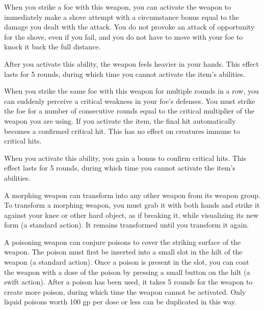 
 When you strike a foe with this weapon, you can activate the weapon to immediately make a shove attempt with a circumstance bonus equal to the damage you dealt with the attack. You do not provoke an attack of opportunity for the shove, even if you fail, and you do not have to move with your foe to knock it back the full distance.

After you activate this ability, the weapon feels heavier in your hands. This effect lasts for 5 rounds, during which time you cannot activate the item's abilities.


 When you strike the same foe with this weapon for multiple rounds in a row, you can suddenly perceive a critical weakness in your foe's defenses. You must strike the foe for a number of consecutive rounds equal to the critical multiplier of the weapon you are using. If you activate the item, the final hit automatically becomes a confirmed critical hit. This has no effect on creatures immune to critical hits.

When you activate this ability, you gain a  bonus to confirm critical hits. This effect lasts for 5 rounds, during which time you cannot activate the item's abilities.


 A morphing weapon can transform into any other weapon from its weapon group. To transform a morphing weapon, you must grab it with both hands and strike it against your knee or other hard object, as if breaking it, while visualizing its new form (a standard action). It remains transformed until you transform it again.


 A poisoning weapon can conjure poisons to cover the striking surface of the weapon. The poison must first be inserted into a small slot in the hilt of the weapon (a standard action). Once a poison is present in the slot, you can coat the weapon with a dose of the poison by pressing a small button on the hilt (a swift action). After a poison has been used, it takes 5 rounds for the weapon to create more poison, during which time the weapon cannot be activated. Only liquid poisons worth 100 gp per dose or less can be duplicated in this way.

